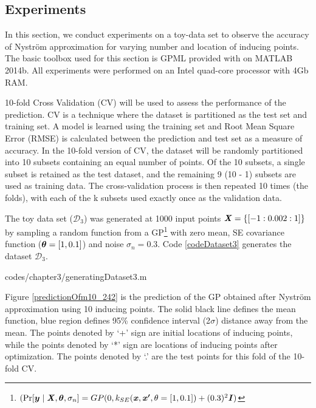 \subsection{Experiments}\label{subsecNystromExperiments}
In this section, we conduct experiments on a toy-data set to observe the accuracy of Nystr\"{o}m approximation for varying number and location of inducing points. The basic toolbox used for this section is GPML provided with \cite{Rasmussen2005} on MATLAB 2014b. All experiments were performed on an Intel quad-core processor with 4Gb RAM. 

10-fold Cross Validation (CV) will be used to assess the performance of the prediction. CV is a technique where the dataset is partitioned as the test set and training set. A model is learned using the training set and Root Mean Square Error (RMSE) is calculated between the prediction and test set as a measure of accuracy. In the 10-fold version of CV, the dataset will be randomly partitioned into 10 subsets containing an equal number of points. Of the 10 subsets, a single subset is retained as the test dataset, and the remaining 9 (10 - 1) subsets are used as training data. The cross-validation process is then repeated 10 times (the folds), with each of the k subsets used exactly once as the validation data.

The toy data set ($\mathcal{D}_{3}$) was generated at 1000 input points $\bm{\mathit{X}} = \{[-1:0.002:1]\}$ by sampling a random function from a GP\footnote{$(\Pr[\boldsymbol{y} \mid \bm{\mathit{X}}, \boldsymbol{\theta}, \sigma_{n}] = GP(0, k_{SE}(\bm{\mathit{x}}, \bm{\mathit{x'}}, \theta = [1, 0.1]) + (0.3)^{2}\bm{\mathit{I}})$} with zero mean, SE covariance function ($\boldsymbol{\theta} = [1, 0.1]$) and noise $\sigma_{n} = 0.3$. Code \ref{codeDataset3} generates the dataset $\mathcal{D}_{3}$.

\begin{mdframed}[hidealllines=true,backgroundcolor=lightgray!20]

                    {codes/chapter3/generatingDataset3.m}
\end{mdframed}

Figure \ref{predictionOfm10_242} is the prediction of the GP obtained after Nystr\"{o}m approximation using 10 inducing points. The solid black line defines the mean function, blue region defines 95\% confidence interval (2$\sigma$) distance away from the mean. The points denoted by `+' sign are initial locations of inducing points, while the points denoted by `*' sign are locations of inducing points after optimization. The points denoted by `.' are the test points for this fold of the 10-fold CV. 

